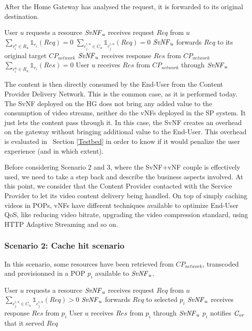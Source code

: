After the Home Gateway has analysed the request, it is forwarded to its original destination.

\begin{algorithmic}[1]
	
\STATE User $u$ requests a resource
\STATE $\mathit{SvNF}_{u}$ receives request $\mathit{Req}$ from $u$
\STATE \( \sum_{r^{u}_{i}\in R_{u}}{\mathbb{1}_{r_{i}}(\mathit{Req})}=0 \)
\STATE \( \sum_{c^{i,u}_{j}\in C_{u}}{\mathbb{1}_{c^{i,u}_{j}}(\mathit{Req})}=0 \)
\STATE $\mathit{SvNF}_{u}$ forwards $\mathit{Req}$ to its original target \(\mathit{CP}_{\mathit{network}}\)
\STATE $\mathit{SvNF}_{u}$ receives response $\mathit{Res}$ from \(\mathit{CP}_{\mathit{network}}\)
\STATE \( \sum_{r^{u}_{i}\in R_{u}}{\mathbb{1}_{r_{i}}(\mathit{Res})}=0 \)
\STATE User $u$ receives $\mathit{Res}$ from \(\mathit{CP}_{\mathit{network}}\) through $\mathit{SvNF}_{u}$
\end{algorithmic}


The content is then directly consumed by the End-User from the Content Provider Delivery Network.
This is the common case, as it is performed today. The SvNF deployed on the HG does not bring any added value to the consumption of video streams, neither do the vNFs deployed in the SP system. It just lets the content pass through it.
In this case, the SvNF creates an overhead on the gateway without bringing additional value to the End-User.
This overhead is evaluated in ~Section \ref{Testbed} in order to know if it would penalize the user experience (and in which extent).

Before considering Scenario 2 and 3, where the SvNF+vNF couple is effectively used, we need to take a step back and describe the business aspects involved. At this point, we consider that the Content Provider contacted with the Service Provider to let its video content delivery being handled. On top of simply caching videos in POPs, vNFs have different techniques available to optimize End-User QoS, like reducing video bitrate, upgrading the video compression standard, using HTTP Adaptive Streaming and so on.

\subsubsection*{Scenario 2: Cache hit scenario}

In this scenario, some resources have been retrieved from \(\mathit{CP}_{\mathit{network}}\), transcoded and provisionned in a POP $p_{i}$ available to $\mathit{SvNF}_{u}$.

\begin{algorithmic}[1]
	\STATE User $u$ requests a resource
\STATE $\mathit{SvNF}_{u}$ receives request $\mathit{Req}$ from $u$
\STATE \( \sum_{c^{i,u}_{j}\in C_{u}}{\mathbb{1}_{c^{i,u}_{j}}(\mathit{Req})}>0\)
\STATE $\mathit{SvNF}_{u}$ forwards $\mathit{Req}$ to selected $p_{i}$
\STATE $\mathit{SvNF}_{u}$ receives response $\mathit{Res}$ from $p_{i}$
\STATE User $u$ receives $\mathit{Res}$ from $p_{i}$ through $\mathit{SvNF}_{u}$
\STATE $p_{i}$ notifies $\mathit{C_{or}}$ that it served  $\mathit{Req}$
\end{algorithmic}


